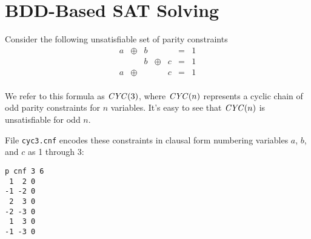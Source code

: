\newpage

\section*{BDD-Based SAT Solving}

Consider the following unsatisfiable set of parity constraints
\begin{displaymath}
\begin{array}{ccccccc}
a & \oplus & b  &        &   & = & 1 \\
  &        & b  & \oplus & c & = & 1 \\
a & \oplus &    &        & c & = & 1 \\
\end{array}
\end{displaymath}

We refer to this formula as ${\it CYC}(3)$, where ${\it CYC}(n)$
represents a cyclic chain of odd parity constraints for $n$ variables.
It's easy to see that ${\it CYC}(n)$ is unsatisfiable for odd $n$.

File
\texttt{cyc3.cnf} encodes these constraints in clausal form
numbering variables $a$, $b$, and $c$ as 1 through 3:
\begin{lstlisting}
p cnf 3 6
 1  2 0
-1 -2 0
 2  3 0
-2 -3 0
 1  3 0
-1 -3 0
\end{lstlisting}

\newpage

